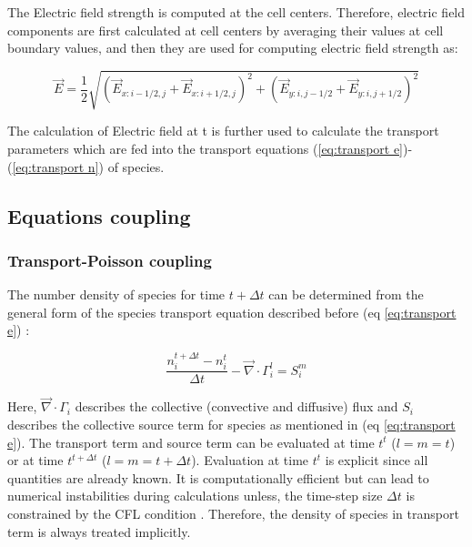 \documentclass[paper=a4, fontsize=13pt]{scrartcl}
\begin{document}
The Electric field strength is computed at the cell centers. Therefore, electric field components are first calculated at cell centers by averaging their values at cell boundary values, and then they are used for computing electric field strength as:

\begin{equation}
\vec{E} = \frac{1}{2} \sqrt{(\vec{E}_{x:i-1/2,j} + \vec{E}_{x:i+1/2,j})^2 + (\vec{E}_{y:i,j-1/2} + \vec{E}_{y:i,j+1/2})^2}
\end{equation}

The calculation of Electric field at t is further used to calculate the transport parameters which are fed into the transport equations (\ref{eq:transport e})-(\ref{eq:transport n}) of species. 





\subsection{Equations coupling}

\subsubsection{Transport-Poisson coupling}


The number density of species for time $t+\Delta t$ can be determined from the general form of the species transport equation described before (eq \ref{eq:transport e}) :

\begin{equation}
\frac{n_i^{t+\Delta t} - n_i^t}{\Delta t}  - \vec{\nabla} \cdot \Gamma^{l}_i = S^{m}_i
\end{equation}

Here, $\vec{\nabla} \cdot \Gamma_i$ describes the collective (convective and diffusive) flux and $S_i$ describes the collective source term for species as mentioned in (eq \ref{eq:transport e}). The transport term and source term can be evaluated at time $t^{t}$ ($l=m=t$) or at time $t^{t+\Delta t}$ ($l=m=t+\Delta t$). Evaluation at time $t^{t}$ is explicit since all quantities are already known. It is computationally efficient but can lead to numerical instabilities during calculations unless, the time-step size $\Delta t$ is constrained by the CFL condition \cite{Ventzek1994Two-dimensionalProcessing}. Therefore, the density of species in transport term is always treated implicitly.
\end{document}
